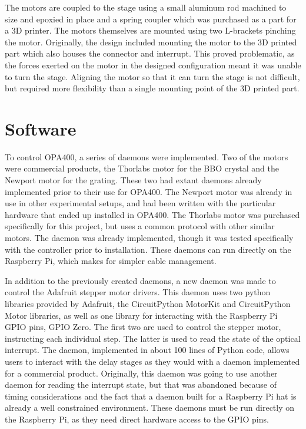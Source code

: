 The motors are coupled to the stage using a small aluminum rod machined to size and epoxied in place and a spring coupler which was purchased as a part for a 3D printer.
The motors themselves are mounted using two L-brackets pinching the motor.
Originally, the design included mounting the motor to the 3D printed part which also houses the connector and interrupt.
This proved problematic, as the forces exerted on the motor in the designed configuration meant it was unable to turn the stage.
Aligning the motor so that it can turn the stage is not difficult, but required more flexibility than a single mounting point of the 3D printed part.


\clearpage

\section{Software}  %

To control OPA400, a series of \yaq{} daemons were implemented.
Two of the motors were commercial products, the Thorlabs motor for the BBO crystal and the Newport motor for the grating.
These two had extant daemons already implemented prior to their use for OPA400\cite{yaqd-thorlabs}\cite{yaqd-newport}.
The Newport motor was already in use in other experimental setups, and had been written with the particular hardware that ended up installed in OPA400.
The Thorlabs motor was purchased specifically for this project, but uses a common protocol with other similar motors.
The daemon was already implemented, though it was tested specifically with the controller prior to installation.
These daemons can run directly on the Raspberry Pi, which makes for simpler cable management.

In addition to the previously created daemons, a new daemon was made to control the Adafruit stepper motor drivers.
This daemon uses two python libraries provided by Adafruit, the CircuitPython MotorKit\cite{adafruit-circuitpython-motorkit} and CircuitPython Motor\cite{adafruit-circuitpython-motor} libraries, as well as one library for interacting with the Raspberry Pi GPIO pins, GPIO Zero\cite{gpiozero}.
The first two are used to control the stepper motor, instructing each individual step.
The latter is used to read the state of the optical interrupt.
The daemon, implemented in about 100 lines of Python code, allows users to interact with the delay stages as they would with a daemon implemented for a commercial product.
Originally, this daemon was going to use another daemon for reading the interrupt state, but that was abandoned because of timing considerations and the fact that a daemon built for a Raspberry Pi hat is already a well constrained environment.
These daemons must be run directly on the Raspberry Pi, as they need direct hardware access to the GPIO pins.

